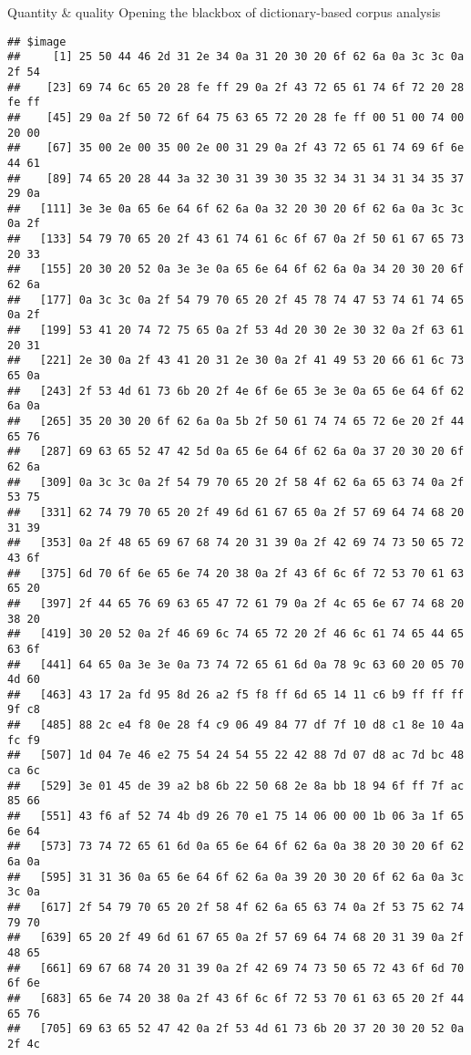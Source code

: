 \documentclass[
  ignorenonframetext,
]{beamer}
\begin{document}
\begin{frame}[fragile]{Quantity \& quality \textbar{} Opening the
blackbox of dictionary-based corpus analysis}
\begin{verbatim}
## $image
##     [1] 25 50 44 46 2d 31 2e 34 0a 31 20 30 20 6f 62 6a 0a 3c 3c 0a 2f 54
##    [23] 69 74 6c 65 20 28 fe ff 29 0a 2f 43 72 65 61 74 6f 72 20 28 fe ff
##    [45] 29 0a 2f 50 72 6f 64 75 63 65 72 20 28 fe ff 00 51 00 74 00 20 00
##    [67] 35 00 2e 00 35 00 2e 00 31 29 0a 2f 43 72 65 61 74 69 6f 6e 44 61
##    [89] 74 65 20 28 44 3a 32 30 31 39 30 35 32 34 31 34 31 34 35 37 29 0a
##   [111] 3e 3e 0a 65 6e 64 6f 62 6a 0a 32 20 30 20 6f 62 6a 0a 3c 3c 0a 2f
##   [133] 54 79 70 65 20 2f 43 61 74 61 6c 6f 67 0a 2f 50 61 67 65 73 20 33
##   [155] 20 30 20 52 0a 3e 3e 0a 65 6e 64 6f 62 6a 0a 34 20 30 20 6f 62 6a
##   [177] 0a 3c 3c 0a 2f 54 79 70 65 20 2f 45 78 74 47 53 74 61 74 65 0a 2f
##   [199] 53 41 20 74 72 75 65 0a 2f 53 4d 20 30 2e 30 32 0a 2f 63 61 20 31
##   [221] 2e 30 0a 2f 43 41 20 31 2e 30 0a 2f 41 49 53 20 66 61 6c 73 65 0a
##   [243] 2f 53 4d 61 73 6b 20 2f 4e 6f 6e 65 3e 3e 0a 65 6e 64 6f 62 6a 0a
##   [265] 35 20 30 20 6f 62 6a 0a 5b 2f 50 61 74 74 65 72 6e 20 2f 44 65 76
##   [287] 69 63 65 52 47 42 5d 0a 65 6e 64 6f 62 6a 0a 37 20 30 20 6f 62 6a
##   [309] 0a 3c 3c 0a 2f 54 79 70 65 20 2f 58 4f 62 6a 65 63 74 0a 2f 53 75
##   [331] 62 74 79 70 65 20 2f 49 6d 61 67 65 0a 2f 57 69 64 74 68 20 31 39
##   [353] 0a 2f 48 65 69 67 68 74 20 31 39 0a 2f 42 69 74 73 50 65 72 43 6f
##   [375] 6d 70 6f 6e 65 6e 74 20 38 0a 2f 43 6f 6c 6f 72 53 70 61 63 65 20
##   [397] 2f 44 65 76 69 63 65 47 72 61 79 0a 2f 4c 65 6e 67 74 68 20 38 20
##   [419] 30 20 52 0a 2f 46 69 6c 74 65 72 20 2f 46 6c 61 74 65 44 65 63 6f
##   [441] 64 65 0a 3e 3e 0a 73 74 72 65 61 6d 0a 78 9c 63 60 20 05 70 4d 60
##   [463] 43 17 2a fd 95 8d 26 a2 f5 f8 ff 6d 65 14 11 c6 b9 ff ff ff 9f c8
##   [485] 88 2c e4 f8 0e 28 f4 c9 06 49 84 77 df 7f 10 d8 c1 8e 10 4a fc f9
##   [507] 1d 04 7e 46 e2 75 54 24 54 55 22 42 88 7d 07 d8 ac 7d bc 48 ca 6c
##   [529] 3e 01 45 de 39 a2 b8 6b 22 50 68 2e 8a bb 18 94 6f ff 7f ac 85 66
##   [551] 43 f6 af 52 74 4b d9 26 70 e1 75 14 06 00 00 1b 06 3a 1f 65 6e 64
##   [573] 73 74 72 65 61 6d 0a 65 6e 64 6f 62 6a 0a 38 20 30 20 6f 62 6a 0a
##   [595] 31 31 36 0a 65 6e 64 6f 62 6a 0a 39 20 30 20 6f 62 6a 0a 3c 3c 0a
##   [617] 2f 54 79 70 65 20 2f 58 4f 62 6a 65 63 74 0a 2f 53 75 62 74 79 70
##   [639] 65 20 2f 49 6d 61 67 65 0a 2f 57 69 64 74 68 20 31 39 0a 2f 48 65
##   [661] 69 67 68 74 20 31 39 0a 2f 42 69 74 73 50 65 72 43 6f 6d 70 6f 6e
##   [683] 65 6e 74 20 38 0a 2f 43 6f 6c 6f 72 53 70 61 63 65 20 2f 44 65 76
##   [705] 69 63 65 52 47 42 0a 2f 53 4d 61 73 6b 20 37 20 30 20 52 0a 2f 4c

\end{verbatim}
\end{frame}
\end{document}
